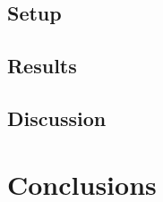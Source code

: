 \documentclass{beamer}
\begin{document}
\subsection{Setup}
\subsection{Results}
\subsection{Discussion}

\section{Conclusions}









\end{document}
